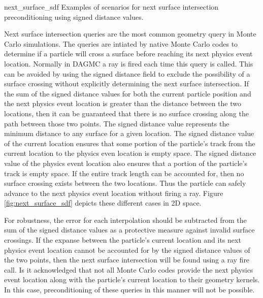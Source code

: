              {next_surface_sdf}
             {Examples of scenarios for next surface intersection preconditioning using signed distance values.}
             {
               Next surface intersection queries are the most common geometry
               query in Monte Carlo simulations. The queries are intiated by
               native Monte Carlo codes to determine if a particle will cross a
               surface before reaching its next physics event location. Normally
               in DAGMC a ray is fired each time this query is called. This can
               be avoided by using the signed distance field to exclude the
               possibility of a surface crossing without explicitly determining
               the next surface intersection. If the sum of the signed distance
               values for both the current particle position and the next
               physics event location is greater than the distance between the
               two locations, then it can be guaranteed that there is no surface
               crossing along the path between those two points. The signed
               distance value represents the minimum distance to any surface for
               a given location. The signed distance value of the current
               location ensures that some portion of the particle's track from
               the current location to the physics even location is empty
               space. The signed distance value of the physics event location
               also ensures that a portion of the particle's track is empty
               space. If the entire track length can be accounted for, then no
               surface crossing exists between the two locations. Thus the
               particle can safely advance to the next physics event location
               without firing a ray. Figure \ref{fig:next_surface_sdf} depicts
               these different cases in 2D space.
               
               For robustness, the error for each interpolation should be
               subtracted from the sum of the signed distance values as a
               protective measure against invalid surface crossings. If the
               expanse between the particle's current location and its next
               physics event location cannot be accounted for by the signed
               distance values of the two points, then the next surface
               intersection will be found using a ray fire
               call. Is it acknowledged that not all
               Monte Carlo codes provide the next physics event location along
               with the particle's current location to their geometry
               kernels. In this case, preconditioning of these queries in this
               manner will not be possible.
              }

